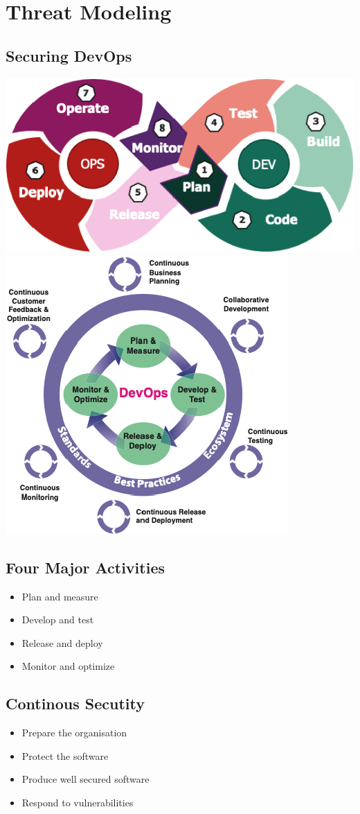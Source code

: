 
\section{Threat Modeling}
\subsection{Securing DevOps}
\includegraphics[width=0.5\linewidth]{../img/devops_infinity.png}
\includegraphics[width=0.5\linewidth]{../img/devops_reference_architecture.png}

\subsection{Four Major Activities}
\begin{itemize}
    \item Plan and measure
    \item Develop and test
    \item Release and deploy
    \item Monitor and optimize
\end{itemize}

\subsection{Continous Secutity}
\begin{itemize}
    \item Prepare the organisation
    \item Protect the software
    \item Produce well secured software
    \item Respond to vulnerabilities
\end{itemize}

